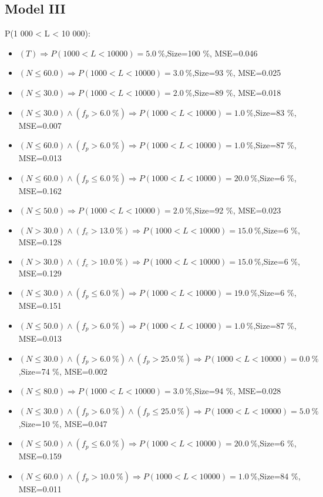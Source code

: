 \documentclass[numbered]{CSL}
\begin{document}
\subsection{Model III}
P(1 000 < L < 10 000):
\begin{itemize}
\item $(T) \Rightarrow P(1 000 < L < 10 000) = 5.0~\%$,\hfill Size=100 \%, MSE=0.046
\item $(N \leq 60.0) \Rightarrow P(1 000 < L < 10 000) = 3.0~\%$,\hfill Size=93 \%, MSE=0.025
\item $(N \leq 30.0) \Rightarrow P(1 000 < L < 10 000) = 2.0~\%$,\hfill Size=89 \%, MSE=0.018
\item $(N \leq 30.0) \land (f_p > 6.0~\%) \Rightarrow P(1 000 < L < 10 000) = 1.0~\%$,\hfill Size=83 \%, MSE=0.007
\item $(N \leq 60.0) \land (f_p > 6.0~\%) \Rightarrow P(1 000 < L < 10 000) = 1.0~\%$,\hfill Size=87 \%, MSE=0.013
\item $(N \leq 60.0) \land (f_p \leq 6.0~\%) \Rightarrow P(1 000 < L < 10 000) = 20.0~\%$,\hfill Size=6 \%, MSE=0.162
\item $(N \leq 50.0) \Rightarrow P(1 000 < L < 10 000) = 2.0~\%$,\hfill Size=92 \%, MSE=0.023
\item $(N > 30.0) \land (f_c > 13.0~\%) \Rightarrow P(1 000 < L < 10 000) = 15.0~\%$,\hfill Size=6 \%, MSE=0.128
\item $(N > 30.0) \land (f_c > 10.0~\%) \Rightarrow P(1 000 < L < 10 000) = 15.0~\%$,\hfill Size=6 \%, MSE=0.129
\item $(N \leq 30.0) \land (f_p \leq 6.0~\%) \Rightarrow P(1 000 < L < 10 000) = 19.0~\%$,\hfill Size=6 \%, MSE=0.151
\item $(N \leq 50.0) \land (f_p > 6.0~\%) \Rightarrow P(1 000 < L < 10 000) = 1.0~\%$,\hfill Size=87 \%, MSE=0.013
\item $(N \leq 30.0) \land (f_p > 6.0~\%) \land (f_p > 25.0~\%) \Rightarrow P(1 000 < L < 10 000) = 0.0~\%$,\hfill Size=74 \%, MSE=0.002
\item $(N \leq 80.0) \Rightarrow P(1 000 < L < 10 000) = 3.0~\%$,\hfill Size=94 \%, MSE=0.028
\item $(N \leq 30.0) \land (f_p > 6.0~\%) \land (f_p \leq 25.0~\%) \Rightarrow P(1 000 < L < 10 000) = 5.0~\%$,\hfill Size=10 \%, MSE=0.047
\item $(N \leq 50.0) \land (f_p \leq 6.0~\%) \Rightarrow P(1 000 < L < 10 000) = 20.0~\%$,\hfill Size=6 \%, MSE=0.159
\item $(N \leq 60.0) \land (f_p > 10.0~\%) \Rightarrow P(1 000 < L < 10 000) = 1.0~\%$,\hfill Size=84 \%, MSE=0.011

\end{itemize}
\end{document}
